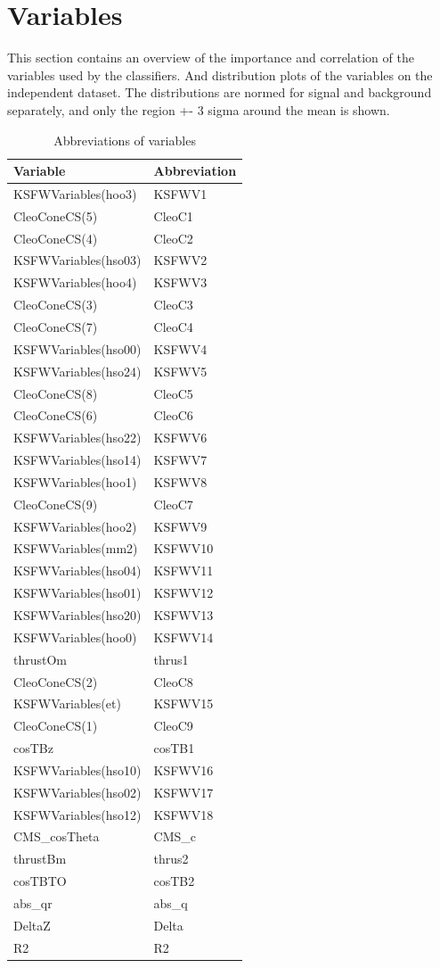 \documentclass[10pt,a4paper]{article}
\begin{document}
\section{Variables}

            This section contains an overview of the importance and correlation of the variables used by the classifiers.
            And distribution plots of the variables on the independent dataset. The distributions are normed for signal and
            background separately, and only the region +- 3 sigma around the mean is shown.
        \begin{center}
\begin{longtable}{ll}
\caption{Abbreviations of variables}\\
\toprule
Variable & Abbreviation\\
\midrule
KSFWVariables(hoo3) & KSFWV1\\
CleoConeCS(5) & CleoC1\\
CleoConeCS(4) & CleoC2\\
KSFWVariables(hso03) & KSFWV2\\
KSFWVariables(hoo4) & KSFWV3\\
CleoConeCS(3) & CleoC3\\
CleoConeCS(7) & CleoC4\\
KSFWVariables(hso00) & KSFWV4\\
KSFWVariables(hso24) & KSFWV5\\
CleoConeCS(8) & CleoC5\\
CleoConeCS(6) & CleoC6\\
KSFWVariables(hso22) & KSFWV6\\
KSFWVariables(hso14) & KSFWV7\\
KSFWVariables(hoo1) & KSFWV8\\
CleoConeCS(9) & CleoC7\\
KSFWVariables(hoo2) & KSFWV9\\
KSFWVariables(mm2) & KSFWV10\\
KSFWVariables(hso04) & KSFWV11\\
KSFWVariables(hso01) & KSFWV12\\
KSFWVariables(hso20) & KSFWV13\\
KSFWVariables(hoo0) & KSFWV14\\
thrustOm & thrus1\\
CleoConeCS(2) & CleoC8\\
KSFWVariables(et) & KSFWV15\\
CleoConeCS(1) & CleoC9\\
cosTBz & cosTB1\\
KSFWVariables(hso10) & KSFWV16\\
KSFWVariables(hso02) & KSFWV17\\
KSFWVariables(hso12) & KSFWV18\\
CMS\_cosTheta & CMS\_c\\
thrustBm & thrus2\\
cosTBTO & cosTB2\\
abs\_qr & abs\_q\\
DeltaZ & Delta\\
R2 & R2\\
\bottomrule
\end{longtable}
\end{center}
\end{document}
